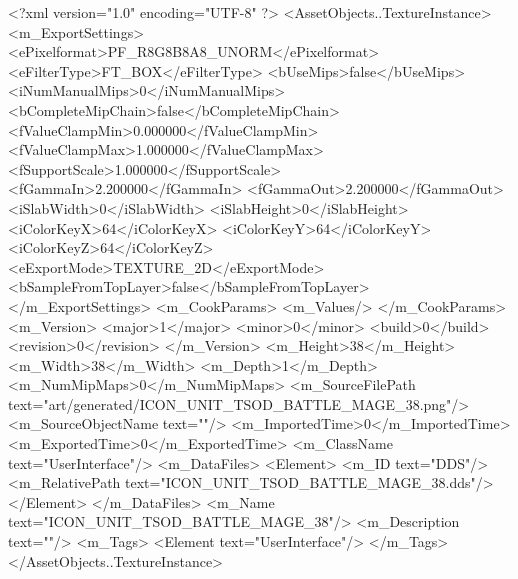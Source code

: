 <?xml version="1.0" encoding="UTF-8" ?>
<AssetObjects..TextureInstance>
	<m_ExportSettings>
		<ePixelformat>PF_R8G8B8A8_UNORM</ePixelformat>
		<eFilterType>FT_BOX</eFilterType>
		<bUseMips>false</bUseMips>
		<iNumManualMips>0</iNumManualMips>
		<bCompleteMipChain>false</bCompleteMipChain>
		<fValueClampMin>0.000000</fValueClampMin>
		<fValueClampMax>1.000000</fValueClampMax>
		<fSupportScale>1.000000</fSupportScale>
		<fGammaIn>2.200000</fGammaIn>
		<fGammaOut>2.200000</fGammaOut>
		<iSlabWidth>0</iSlabWidth>
		<iSlabHeight>0</iSlabHeight>
		<iColorKeyX>64</iColorKeyX>
		<iColorKeyY>64</iColorKeyY>
		<iColorKeyZ>64</iColorKeyZ>
		<eExportMode>TEXTURE_2D</eExportMode>
		<bSampleFromTopLayer>false</bSampleFromTopLayer>
	</m_ExportSettings>
	<m_CookParams>
		<m_Values/>
	</m_CookParams>
	<m_Version>
		<major>1</major>
		<minor>0</minor>
		<build>0</build>
		<revision>0</revision>
	</m_Version>
	<m_Height>38</m_Height>
	<m_Width>38</m_Width>
	<m_Depth>1</m_Depth>
	<m_NumMipMaps>0</m_NumMipMaps>
	<m_SourceFilePath text="art/generated/ICON_UNIT_TSOD_BATTLE_MAGE_38.png"/>
	<m_SourceObjectName text=""/>
	<m_ImportedTime>0</m_ImportedTime>
	<m_ExportedTime>0</m_ExportedTime>
	<m_ClassName text="UserInterface"/>
	<m_DataFiles>
		<Element>
			<m_ID text="DDS"/>
			<m_RelativePath text="ICON_UNIT_TSOD_BATTLE_MAGE_38.dds"/>
		</Element>
	</m_DataFiles>
	<m_Name text="ICON_UNIT_TSOD_BATTLE_MAGE_38"/>
	<m_Description text=""/>
	<m_Tags>
		<Element text="UserInterface"/>
	</m_Tags>
</AssetObjects..TextureInstance>
